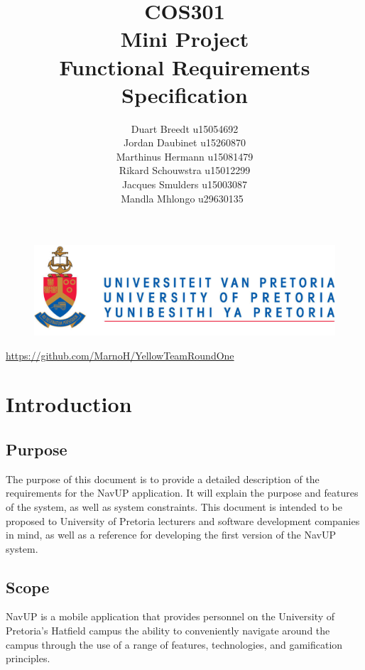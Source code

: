 \documentclass[12pt]{article}
\begin{document}
	

	\begin{figure}
		\includegraphics[width=\linewidth]{logo.jpg}	
	\end{figure}

	\title 	{
				COS301\\
				Mini Project\\
				Functional Requirements Specification
		   	}
	\author {
				Duart Breedt u15054692\\
				Jordan Daubinet u15260870\\
				Marthinus Hermann u15081479\\
				Rikard Schouwstra u15012299\\
				Jacques Smulders u15003087\\
				Mandla Mhlongo u29630135\
			}
	\maketitle
	\begin{center}
			\url{https://github.com/MarnoH/YellowTeamRoundOne}	
	\end{center}
	\newpage
	\tableofcontents
	\newpage
	\section{Introduction}
		
	\subsection{Purpose}
		The purpose of this document is to provide a detailed description of the requirements for the NavUP application. It will explain the purpose and features of the system, as well as system constraints.
This document is intended to be proposed to University of Pretoria lecturers and software development companies in mind, as well as a reference for developing the first version of the NavUP system.
		
	\subsection{Scope}
		NavUP is a mobile application that provides personnel on the University of Pretoria’s Hatfield campus the ability to conveniently navigate around the campus through the use of a range of features, technologies, and gamification principles.
\end{document}
